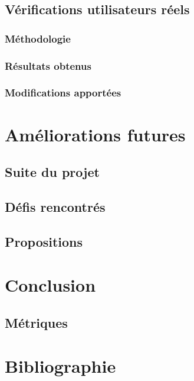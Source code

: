 \documentclass{EPL-master-thesis-covers-FR}
\begin{document}
		\section{Vérifications utilisateurs réels}


			\subsection*{Méthodologie}

				

			\subsection*{Résultats obtenus}

				

			\subsection*{Modifications apportées}

		

	\chapter{Améliorations futures}


		\section{Suite du projet}
			\label{ref:suite_projet}

		

		\section{Défis rencontrés}

			

		\section{Propositions}

			
	\chapter{Conclusion}

		

		\section{Métriques}
		

	\chapter{Bibliographie}

		
		
		

	

	\setlength{\parskip}{0em}
	\backcoverpage
\end{document}
